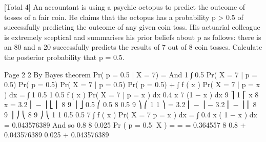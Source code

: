 \documentclass[a4paper,12pt]{article}
\begin{document}
[Total 4]
An accountant is using a psychic octopus to predict the outcome of tosses of a fair
coin. He claims that the octopus has a probability p > 0.5 of successfully predicting
the outcome of any given coin toss. His actuarial colleague is extremely sceptical and
summarises his prior beliefs about p as follows: there is an 80%
and a 20%
successfully predicts the results of 7 out of 8 coin tosses.
Calculate the posterior probability that p = 0.5.

Page 2%
2
By Bayes theorem
Pr( p = 0.5 | X = 7) =
And
1
∫ 0.5
Pr( X = 7 | p = 0.5) \times  Pr( p = 0.5)
Pr( X = 7 | p = 0.5) \times  Pr( p = 0.5) + ∫
f ( x ) Pr( X = 7 | p = x ) dx = ∫
1
0.5
1
0.5
f ( x ) Pr( X = 7 | p = x ) dx
0.4  \times  x 7 (1 − x ) dx
9 ⎤ 1
⎡ x 8 x
= 3.2 ⎢ − ⎥
⎣ ⎢ 8 9 ⎥ ⎦ 0.5
⎛ 0.5 8 0.5 9 ⎞
⎛ 1 1 ⎞
= 3.2 ⎜ − ⎟ − 3.2 ⎜
−
⎟
⎜ 8
9 ⎟ ⎠
⎝ 8 9 ⎠
⎝
1 1
0.5 0.5
7
∫ f ( x ) Pr( X = 7 p = x ) dx = ∫ 0.4  \times  x ( 1 − x ) dx
= 0.043576389
And so
0.8   8
0.025
Pr ( p = 0.5| X ) =
=
= 0.364557
8
0.8   + 0.043576389 0.025 + 0.043576389

\end{document}

